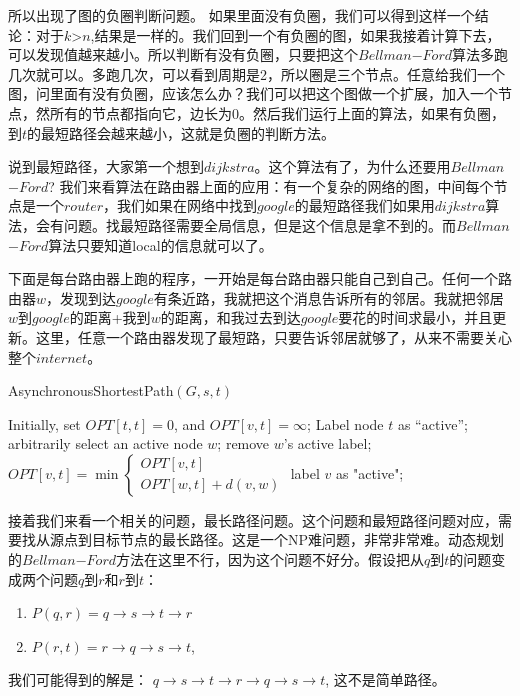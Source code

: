所以出现了图的负圈判断问题。
如果里面没有负圈，我们可以得到这样一个结论：对于$k$>$n$,结果是一样的。我们回到一个有负圈的图，如果我接着计算下去，可以发现值越来越小。所以判断有没有负圈，只要把这个$Bellman$$-$$Ford$算法多跑几次就可以。多跑几次，可以看到周期是2，所以圈是三个节点。任意给我们一个图，问里面有没有负圈，应该怎么办？我们可以把这个图做一个扩展，加入一个节点，然所有的节点都指向它，边长为0。然后我们运行上面的算法，如果有负圈，到$t$的最短路径会越来越小，这就是负圈的判断方法。

说到最短路径，大家第一个想到$dijkstra$。这个算法有了，为什么还要用$Bellman$$-$$Ford$? 我们来看算法在路由器上面的应用：有一个复杂的网络的图，中间每个节点是一个$router$，我们如果在网络中找到$google$的最短路径我们如果用$dijkstra$算法，会有问题。找最短路径需要全局信息，但是这个信息是拿不到的。而$Bellman$$-$$Ford$算法只要知道local的信息就可以了。

下面是每台路由器上跑的程序，一开始是每台路由器只能自己到自己。任何一个路由器$w$，发现到达$google$有条近路，我就把这个消息告诉所有的邻居。我就把邻居$w$到$google$的距离+我到$w$的距离，和我过去到达$google$要花的时间求最小，并且更新。这里，任意一个路由器发现了最短路，只要告诉邻居就够了，从来不需要关心整个$internet$。

\sc AsynchronousShortestPath$( G, s, t )$
\begin{algorithmic}[1]
\STATE Initially, set $OPT[t, t]=0$, and $OPT[v, t]=\infty$;
\STATE Label node $t$ as ``active'';
\STATE arbitrarily select an active node $w$;
\STATE remove $w$'s active label;
\STATE $OPT[v, t] = \min \begin{cases} OPT[v, t] \\ OPT[w, t]+ d(v,w) \end{cases}$
\STATE label $v$ as "active";
\ENDIF
\ENDFOR
\ENDWHILE
\end{algorithmic}
接着我们来看一个相关的问题，最长路径问题。这个问题和最短路径问题对应，需要找从源点到目标节点的最长路径。这是一个NP难问题，非常非常难。动态规划的$Bellman$$-$$Ford$方法在这里不行，因为这个问题不好分。假设把从$q$到$t$的问题变成两个问题$q$到$r$和$r$到$t$：
\begin{enumerate}
\item
 $P(q, r) = q\rightarrow s \rightarrow t\rightarrow r$
\item
 $P(r, t) = r \rightarrow q \rightarrow s \rightarrow t$,
\end{enumerate}

我们可能得到的解是： $q\rightarrow s \rightarrow t\rightarrow r \rightarrow q \rightarrow s \rightarrow t$, 这不是简单路径。

